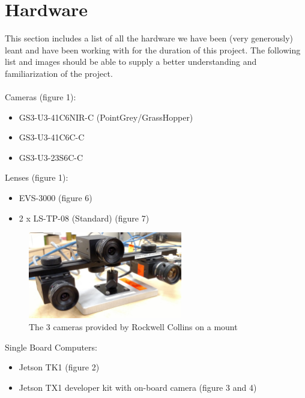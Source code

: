\documentclass[letterpaper,10pt,titlepage]{IEEEtran}
\begin{document}
\section{Hardware}
   This section includes a list of all the hardware we have been (very generously) leant and have been working with for the duration of this project. The following list and images should be able to supply a better understanding and familiarization of the project.\\
	\\Cameras (figure 1):  
    		\begin{itemize}
		\item GS3-U3-41C6NIR-C (PointGrey/GrassHopper)
		\item GS3-U3-41C6C-C
		\item GS3-U3-23S6C-C\\
		\end{itemize}
	Lenses (figure 1): 
		\begin{itemize}
		\item EVS-3000 (figure 6)
		\item 2 x LS-TP-08 (Standard) (figure 7)\\
		\end{itemize}
		
\begin{figure}[!ht]
  \caption{The 3 cameras provided by Rockwell Collins on a mount}
	  \centering
		    \includegraphics[width=0.6\textwidth,natwidth=610,natheight=642]{images/IMG_20160210_131527329.jpg}
				\end{figure}
				
	Single Board Computers: 
		\begin{itemize}
		\item Jetson TK1 (figure 2) 
		\item Jetson TX1 developer kit with on-board camera (figure 3 and 4)\\
		\end{itemize}
 
\end{document}
